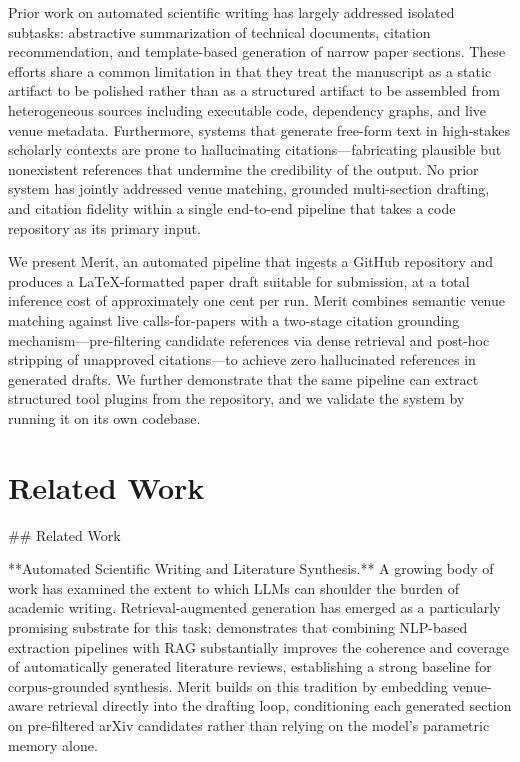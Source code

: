 \documentclass[11pt]{article}
\begin{document}
Prior work on automated scientific writing has largely addressed isolated subtasks: abstractive summarization of technical documents, citation recommendation, and template-based generation of narrow paper sections. These efforts share a common limitation in that they treat the manuscript as a static artifact to be polished rather than as a structured artifact to be assembled from heterogeneous sources including executable code, dependency graphs, and live venue metadata. Furthermore, systems that generate free-form text in high-stakes scholarly contexts are prone to hallucinating citations—fabricating plausible but nonexistent references that undermine the credibility of the output. No prior system has jointly addressed venue matching, grounded multi-section drafting, and citation fidelity within a single end-to-end pipeline that takes a code repository as its primary input.

We present Merit, an automated pipeline that ingests a GitHub repository and produces a LaTeX-formatted paper draft suitable for submission, at a total inference cost of approximately one cent per run. Merit combines semantic venue matching against live calls-for-papers with a two-stage citation grounding mechanism—pre-filtering candidate references via dense retrieval and post-hoc stripping of unapproved citations—to achieve zero hallucinated references in generated drafts. We further demonstrate that the same pipeline can extract structured tool plugins from the repository, and we validate the system by running it on its own codebase.

\section{Related Work}
## Related Work

**Automated Scientific Writing and Literature Synthesis.**
A growing body of work has examined the extent to which LLMs can shoulder the burden of academic writing. Retrieval-augmented generation has emerged as a particularly promising substrate for this task: \cite{arxiv_2411_18583} demonstrates that combining NLP-based extraction pipelines with RAG substantially improves the coherence and coverage of automatically generated literature reviews, establishing a strong baseline for corpus-grounded synthesis. Merit builds on this tradition by embedding venue-aware retrieval directly into the drafting loop, conditioning each generated section on pre-filtered arXiv candidates rather than relying on the model's parametric memory alone.
\end{document}
